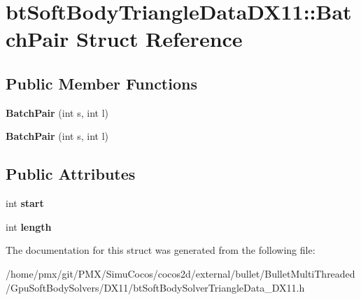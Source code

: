 \hypertarget{structbtSoftBodyTriangleDataDX11_1_1BatchPair}{}\section{bt\+Soft\+Body\+Triangle\+Data\+D\+X11\+:\+:Batch\+Pair Struct Reference}
\label{structbtSoftBodyTriangleDataDX11_1_1BatchPair}
\subsection*{Public Member Functions}
\begin{DoxyCompactItemize}
\item 
\mbox{\label{structbtSoftBodyTriangleDataDX11_1_1BatchPair_a496f16f0e86308e447dc186b979cce2d}} 
{\bfseries Batch\+Pair} (int s, int l)
\item 
\mbox{\label{structbtSoftBodyTriangleDataDX11_1_1BatchPair_a496f16f0e86308e447dc186b979cce2d}} 
{\bfseries Batch\+Pair} (int s, int l)
\end{DoxyCompactItemize}
\subsection*{Public Attributes}
\begin{DoxyCompactItemize}
\item 
\mbox{\label{structbtSoftBodyTriangleDataDX11_1_1BatchPair_ab7d4e9176e6ca76c741b85b4d94f9c6a}} 
int {\bfseries start}
\item 
\mbox{\label{structbtSoftBodyTriangleDataDX11_1_1BatchPair_ac3e6a7c23ee2e06dd8c302d8f52a6ea2}} 
int {\bfseries length}
\end{DoxyCompactItemize}


The documentation for this struct was generated from the following file\+:\begin{DoxyCompactItemize}
\item 
/home/pmx/git/\+P\+M\+X/\+Simu\+Cocos/cocos2d/external/bullet/\+Bullet\+Multi\+Threaded/\+Gpu\+Soft\+Body\+Solvers/\+D\+X11/bt\+Soft\+Body\+Solver\+Triangle\+Data\+\_\+\+D\+X11.\+h\end{DoxyCompactItemize}
